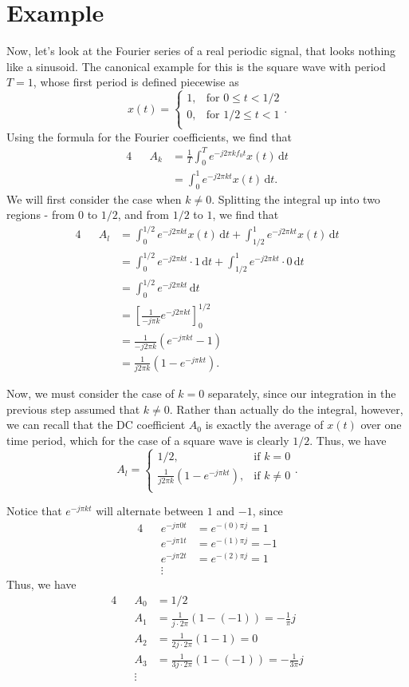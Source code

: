 \documentclass[letterpaper]{article}
\theoremstyle{remark}
\newcommand{\dt}{\mathrm{d}t}
\newcommand{\eqn}[1]{\begin{alignat*}{4}#1\end{alignat*}}
\begin{document}
\section{Example}
Now, let's look at the Fourier series of a real periodic signal, that looks nothing like a sinusoid. The canonical example for this is the square wave with period $T = 1$, whose first period is defined piecewise as
\[
x(t) = 
\begin{cases}
     1, & \text{for } 0 \le t < 1/2 \\
     0, & \text{for } 1/2 \le t < 1 \\
\end{cases}.
\]
Using the formula for the Fourier coefficients, we find that
\eqn{
    && A_k &= \frac{1}{T} \int_0^T e^{-j2\pi k f_0 t} x(t) \, \dt \\
    &&&= \int_0^1 e^{-j2\pi k t} x(t) \, \dt.
}
We will first consider the case when $k \ne 0$. Splitting the integral up into two regions - from $0$ to $1/2$, and from $1/2$ to $1$, we find that
\eqn{
    && A_l &= \int_0^{1/2} e^{-j2\pi kt} x(t) \, \dt + \int_{1/2}^1 e^{-j2\pi kt} x(t) \, \dt \\
    &&&= \int_0^{1/2} e^{-j2\pi kt} \cdot 1 \, \dt + \int_{1/2}^1 e^{-j2\pi kt} \cdot 0 \, \dt \\
    &&&= \int_0^{1/2} e^{-j2\pi kt} \, \dt \\
    &&&= \left[\frac{1}{-j\pi k} e^{-j2\pi kt}\right]_0^{1/2} \\
    &&&= \frac{1}{-j2\pi k} \left(e^{-j\pi k t} - 1\right) \\
    &&&= \frac{1}{j2\pi k} \left(1 - e^{-j\pi k t}\right).
}

Now, we must consider the case of $k = 0$ separately, since our integration in the previous step assumed that $k \ne 0$. Rather than actually do the integral, however, we can recall that the DC coefficient $A_0$ is exactly the average of $x(t)$ over one time period, which for the case of a square wave is clearly $1/2$. Thus, we have
\[
    A_l = \begin{cases}
     1/2, & \text{if } k = 0 \\
     \frac{1}{j2\pi k} \left(1 - e^{-j\pi k t}\right), & \text{if } k \ne 0 \\
    \end{cases}.
\]

Notice that $e^{-j\pi k t}$ will alternate between $1$ and $-1$, since
\eqn{
    && e^{-j\pi 0 t} &= e^{-(0)\pi j} = 1 \\
    && e^{-j\pi 1 t} &= e^{-(1)\pi j} = -1 \\
    && e^{-j\pi 2 t} &= e^{-(2)\pi j} = 1 \\
    && \vdots
}
Thus, we have
\eqn{
    && A_0 &= 1 / 2 \\
    && A_1 &= \frac{1}{j\cdot2\pi}(1 - (-1)) = -\frac{1}{\pi}j \\
    && A_2 &= \frac{1}{2j\cdot 2\pi}(1 - 1) = 0 \\
    && A_3 &= \frac{1}{3j\cdot 2\pi}(1 - (-1)) = -\frac{1}{3\pi}j \\
    && \vdots
}
\end{document}

